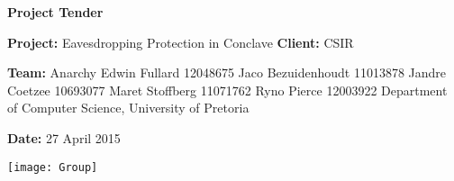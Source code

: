 \begin{titlepage}
	\begin{center}
		\large{\textbf{Project Tender}}\newline
	\end{center}
		\vfill
	\begin{center}
		\LARGE{\textbf{Project:} Eavesdropping Protection in Conclave}\newline
		\textbf{Client:} CSIR\newline
	\end{center}
		\vfill
	\begin{center}
		\LARGE{\textbf{Team:} Anarchy}\newline
		\large{Edwin Fullard 12048675}\newline
		\large{Jaco Bezuidenhoudt 11013878}\newline
		\large{Jandre Coetzee 10693077}\newline
		\large{Maret Stoffberg 11071762}\newline
		\large{Ryno Pierce 12003922}\newline
		\small{Department of Computer Science, University of Pretoria}\newline
	\end{center}
		\vfill
	\begin{center}
		\large{\textbf{Date:} 27 April 2015}
	\end{center}
		\vfill
	\begin{center}
		\texttt{[image: Group]}
	\end{center}
\end{titlepage}
